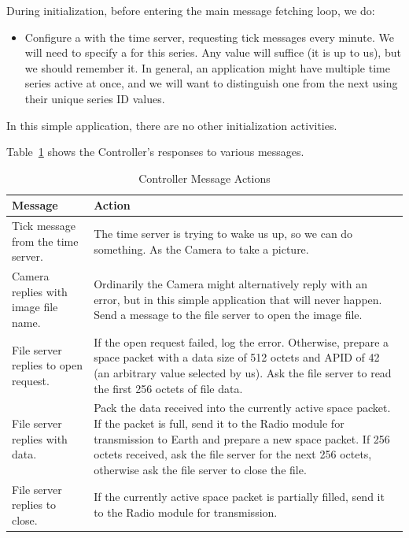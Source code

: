 During initialization, before entering the main message fetching loop, we do:

\begin{itemize}
\item Configure a  with the time server, requesting tick messages every
minute. We will need to specify a  for this series. Any value will suffice
(it is up to us), but we should remember it. In general, an application might have multiple time
series active at once, and we will want to distinguish one from the next using their unique
series ID values.
\end{itemize}

In this simple application, there are no other initialization activities.

Table~\ref{tbl:controller-message-actions} shows the Controller's responses to various messages.

\begin{table}[ht]
    \centering
    \caption{Controller Message Actions}
    \label{tbl:controller-message-actions}
    \renewcommand{\arraystretch}{1.5} %
    \begin{tabularx}{\textwidth}{|>{\hsize=0.35\hsize}X|>{\hsize=0.65\hsize}X|}
        \hline
        \textbf{Message} & \textbf{Action} \\
        \hline \hline
        Tick message from the time server. &

        The time server is trying to wake us up, so we can do something. As the Camera to take a
        picture. \\
        \hline
        Camera replies with image file name. &

        Ordinarily the Camera might alternatively reply with an error, but in this simple
        application that will never happen. Send a message to the file server to open the image
        file. \\
        \hline
        File server replies to open request. &

        If the open request failed, log the error. Otherwise, prepare a space packet with a data
        size of 512 octets and APID of 42 (an arbitrary value selected by us). Ask the file
        server to read the first 256 octets of file data. \\
        \hline
        File server replies with data. &

        Pack the data received into the currently active space packet. If the packet is full,
        send it to the Radio module for transmission to Earth and prepare a new space packet. If
        256 octets received, ask the file server for the next 256 octets, otherwise ask the file
        server to close the file. \\
        \hline
        File server replies to close. &

        If the currently active space packet is partially filled, send it to the Radio module
        for transmission. \\
        \hline
    \end{tabularx}
\end{table}


